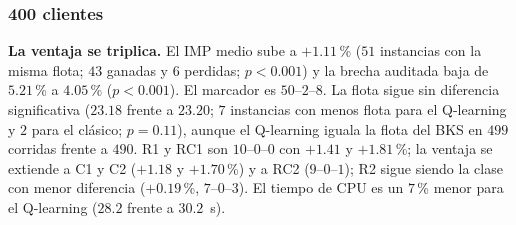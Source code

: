 \subsubsection{400 clientes}
\label{sec:exp-400}

\begin{table}[H]
\centering
\caption{Gehring y Homberger, $400$ clientes: resultados por clase.}
\label{tab:res-400}
\end{table}

\textbf{La ventaja se triplica.} El IMP medio sube a $+1.11$\,\% ($51$ instancias con la
misma flota; $43$ ganadas y $6$ perdidas; $p<0.001$) y la brecha auditada baja de $5.21$\,\% a
$4.05$\,\% ($p<0.001$). El marcador es $50$--$2$--$8$. La flota sigue sin diferencia
significativa ($23.18$ frente a $23.20$; $7$ instancias con menos flota para el Q-learning y $2$
para el clásico; $p=0.11$), aunque el Q-learning iguala la flota del BKS en $499$ corridas
frente a $490$. R1 y RC1 son $10$--$0$--$0$ con $+1.41$ y $+1.81$\,\%; la ventaja se extiende
a C1 y C2 ($+1.18$ y $+1.70$\,\%) y a RC2 ($9$--$0$--$1$); R2 sigue siendo la clase con menor
diferencia ($+0.19$\,\%, $7$--$0$--$3$). El tiempo de CPU es un $7$\,\% menor para el
Q-learning ($28.2$ frente a $30.2$~s).

